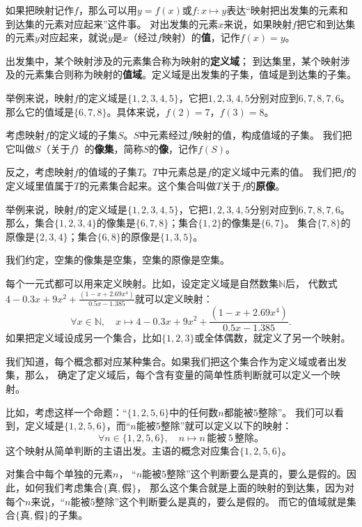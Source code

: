 \documentclass[12pt,UTF8]{ctexbook}
\theoremstyle{definition}
\theoremstyle{plain}
\begin{document}
如果把映射记作$f$，那么可以用$y = f(x)$或$f:x\mapsto y$表达“映射把出发集的元素和到达集的元素对应起来”这件事。
对出发集的元素$x$来说，如果映射$f$把它和到达集的元素$y$对应起来，就说$y$是$x$（经过$f$映射）的\textbf{值}，记作$f(x) = y$。

出发集中，某个映射涉及的元素集合称为映射的\textbf{定义域}；
到达集里，某个映射涉及的元素集合则称为映射的\textbf{值域}。定义域是出发集的子集，值域是到达集的子集。

举例来说，映射$f$的定义域是$\{1,2,3,4,5\}$，它把$1,2,3,4,5$分别对应到$6,7,8,7,6$。
那么它的值域是$\{6,7,8\}$。具体来说，$f(2) = 7$，$f(3) = 8$。

考虑映射$f$的定义域的子集$S$。$S$中元素经过$f$映射的值，构成值域的子集。
我们把它叫做$S$（关于$f$）的\textbf{像集}，简称$S$的\textbf{像}，记作$f(S)$。

反之，考虑映射$f$的值域的子集$T$。$T$中元素总是$f$的定义域中元素的值。
我们把$f$的定义域里值属于$T$的元素集合起来。这个集合叫做$T$关于$f$的\textbf{原像}。

举例来说，映射$f$的定义域是$\{1,2,3,4,5\}$，它把$1,2,3,4,5$分别对应到$6,7,8,7,6$。
那么，集合$\{1,2,3,4\}$的像集是$\{6,7,8\}$；集合$\{1,2\}$的像集是$\{6,7\}$。
集合$\{7,8\}$的原像是$\{2,3,4\}$；集合$\{6,8\}$的原像是$\{1,3,5\}$。

我们约定，空集的像集是空集，空集的原像是空集。

每个一元式都可以用来定义映射。比如，设定定义域是自然数集$\mathbb{N}$后，
代数式$4-0.3x+9x^2+\frac{(1-x+2.69x^4)}{0.5x-1.385}$就可以定义映射：
$$ \forall x\in\mathbb{N}, \quad x \mapsto 4-0.3x+9x^2+\frac{(1-x+2.69x^4)}{0.5x-1.385}. $$
如果把定义域设成另一个集合，比如$\{1,2,3\}$或全体偶数，就定义了另一个映射。

我们知道，每个概念都对应某种集合。如果我们把这个集合作为定义域或者出发集，那么，
确定了定义域后，每个含有变量的简单性质判断就可以定义一个映射。

比如，考虑这样一个命题：“$\{1,2,5,6\}$中的任何数$n$都能被$5$整除”。
我们可以看到，定义域是$\{1,2,5,6\}$，而“$n$能被$5$整除”就可以定义以下的映射：
$$ \forall n\in \{1,2,5,6\} , \quad n \mapsto n\,\mbox{能被}\,5\,\mbox{整除。} $$
这个映射从简单判断的主语出发。主语的概念对应集合$\{1,2,5,6\}$。

对集合中每个单独的元素$n$，
“$n$能被$5$整除”这个判断要么是真的，要么是假的。因此，如何我们考虑集合$\{\mbox{真}, \mbox{假}\}$，
那么这个集合就是上面的映射的到达集，因为对每个$n$来说，“$n$能被$5$整除”这个判断要么是真的，要么是假的。
而它的值域就是集合$\{\mbox{真}, \mbox{假}\}$的子集。
\end{document}
